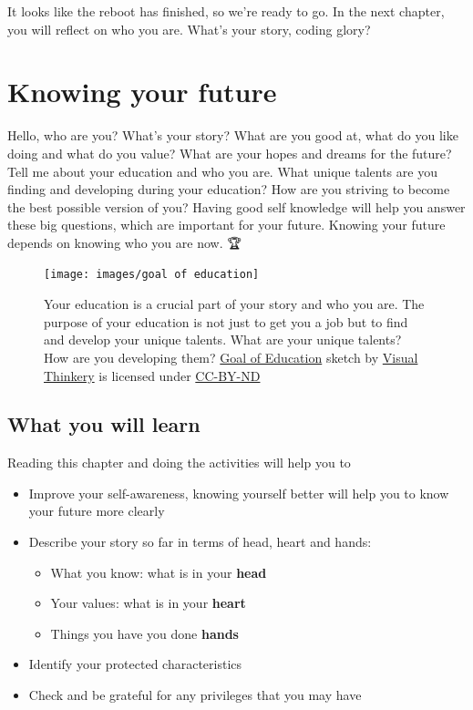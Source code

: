 \documentclass[
]{book}
\providecommand{\tightlist}{%
  \setlength{\itemsep}{0pt}\setlength{\parskip}{0pt}}
\begin{document}
It looks like the reboot has finished, so we're ready to go. In the next chapter, you will reflect on who you are. What's your story, coding glory?

\hypertarget{knowing}{%
\chapter{Knowing your future}\label{knowing}}

Hello, who are you? What's your story? What are you good at, what do you like doing and what do you value? What are your hopes and dreams for the future? Tell me about your education and who you are. What unique talents are you finding and developing during your education? How are you striving to become the best possible version of you? Having good self knowledge will help you answer these big questions, which are important for your future. Knowing your future depends on knowing who you are now. 🏆

\begin{figure}

{\centering \texttt{[image: images/goal of education]} 

}

\caption{Your education is a crucial part of your story and who you are. The purpose of your education is not just to get you a job but to find and develop your unique talents. What are your unique talents? How are you developing them? \href{https://www.flickr.com/photos/122135325@N06/16627558943/}{Goal of Education} sketch by \href{https://visualthinkery.com/}{Visual Thinkery} is licensed under \href{https://creativecommons.org/licenses/by-nd/4.0/}{CC-BY-ND}}\label{fig:goal-fig}
\end{figure}



\hypertarget{ilo2}{%
\section{What you will learn}\label{ilo2}}

Reading this chapter and doing the activities will help you to

\begin{itemize}
\tightlist
\item
  Improve your self-awareness, knowing yourself better will help you to know your future more clearly
\item
  Describe your story so far in terms of head, heart and hands:

  \begin{itemize}
  \tightlist
  \item
    What you know: what is in your \textbf{head}
  \item
    Your values: what is in your \textbf{heart}
  \item
    Things you have you done \textbf{hands}
  \end{itemize}
\item
  Identify your protected characteristics
\item
  Check and be grateful for any privileges that you may have
\end{itemize}
\end{document}
